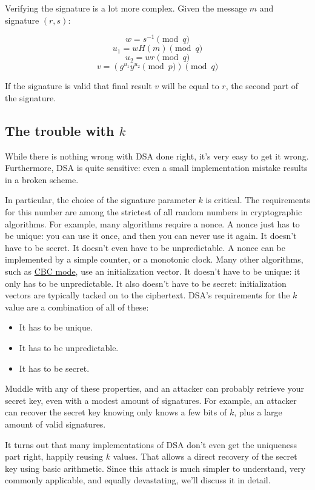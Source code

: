 \documentclass[11pt,ebook,table,dvipsnames]{memoir}
\begin{document}
Verifying the signature is a lot more complex. Given the message $m$
and signature $(r, s)$:

\[
w = s^{-1} \pmod q
\]
\[
u_1 = wH(m) \pmod q
\]
\[
u_2 = wr \pmod q
\]
\[
v = (g^{u_1}y^{u_2} \pmod p) \pmod q
\]

If the signature is valid that final result $v$ will be equal to $r$,
the second part of the signature.
\subsection{The trouble with $k$}
\label{sec-2-8-3-4}

While there is nothing wrong with DSA done right, it's very easy to
get it wrong. Furthermore, DSA is quite sensitive: even a small
implementation mistake results in a broken scheme.

In particular, the choice of the signature parameter $k$ is critical.
The requirements for this number are among the strictest of all random
numbers in cryptographic algorithms. For example, many algorithms
require a \gls{nonce}. A nonce just has to be unique: you can use it
once, and then you can never use it again. It doesn't have to be
secret. It doesn't even have to be unpredictable. A nonce can be
implemented by a simple counter, or a monotonic clock. Many other
algorithms, such as \hyperref[CBC-mode]{CBC mode}, use an initialization vector. It doesn't
have to be unique: it only has to be unpredictable. It also doesn't
have to be secret: initialization vectors are typically tacked on to
the ciphertext. DSA's requirements for the $k$ value are a combination
of all of these:

\begin{itemize}
\item It has to be unique.
\item It has to be unpredictable.
\item It has to be secret.
\end{itemize}

Muddle with any of these properties, and an attacker can probably
retrieve your secret key, even with a modest amount of signatures. For
example, an attacker can recover the secret key knowing only knows a
few bits of $k$, plus a large amount of valid signatures.
\cite{nguyen:dsa}

It turns out that many implementations of DSA don't even get the
uniqueness part right, happily reusing $k$ values. That allows a
direct recovery of the secret key using basic arithmetic. Since this
attack is much simpler to understand, very commonly applicable, and
equally devastating, we'll discuss it in detail.
\end{document}
